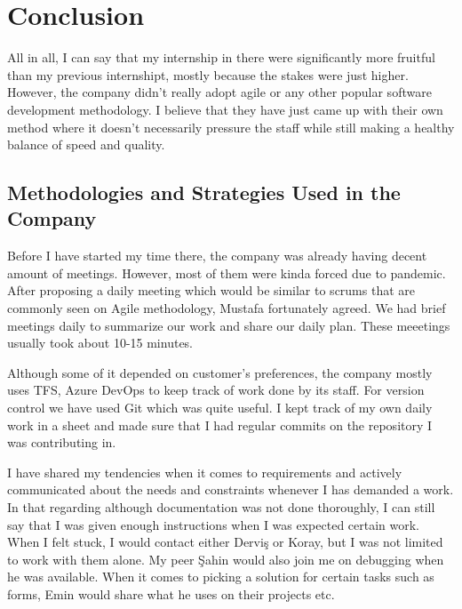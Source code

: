 \chapter{Conclusion}
All in all, I can say that my internship in there were significantly more 
fruitful than my previous internshipt, mostly because the stakes were just 
higher. However, the company didn't really adopt agile or any other popular 
software development methodology. I believe that they have just came up 
with their own method where it doesn't necessarily pressure the staff 
while still making a healthy balance of speed and quality.
\section{Methodologies and Strategies Used in the Company}
Before I have started my time there, the company was already having decent 
amount of meetings. However, most of them were kinda forced due to pandemic. 
After proposing a daily meeting which would be similar to scrums that are 
commonly seen on Agile methodology, Mustafa fortunately agreed. We had 
brief meetings daily to summarize our work and share our daily plan. These 
meeetings usually took about 10-15 minutes.
\par
Although some of it depended on customer's preferences, the company mostly 
uses TFS, Azure DevOps to keep track of work done by its staff. For version 
control we have used Git which was quite useful. I kept track of my own 
daily work in a sheet and made sure that I had regular commits on the 
repository I was contributing in.
\par
I have shared my tendencies when it comes to requirements and actively 
communicated about the needs and constraints whenever I has demanded a work. 
In that regarding although documentation was not done thoroughly, I can still 
say that I was given enough instructions when I was expected certain work. 
When I felt stuck, I would contact either Derviş or Koray, but I was not 
limited to work with them alone. My peer Şahin would also join me on debugging 
when he was available. When it comes to picking a solution for certain tasks 
such as forms, Emin would share what he uses on their projects etc.

